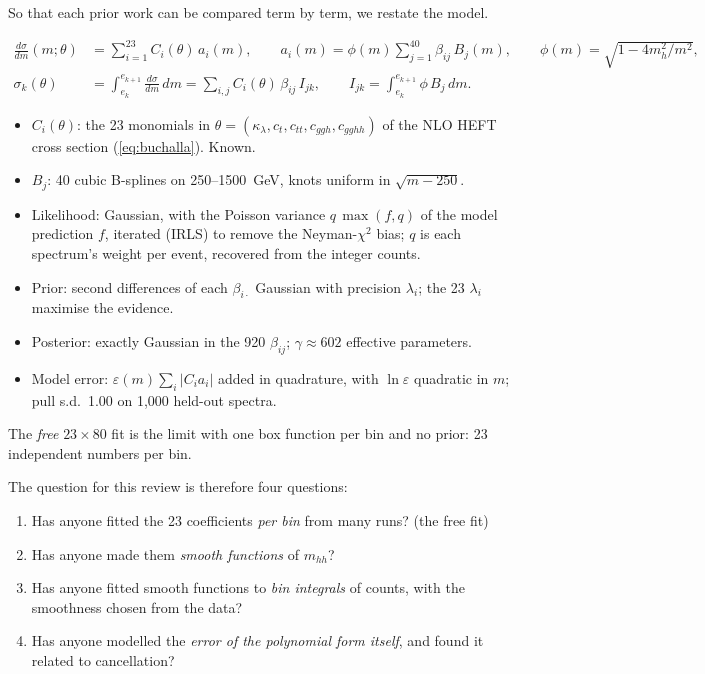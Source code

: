 So that each prior work can be compared term by term, we restate the model.

\begin{keyidea}
\begin{align}
\frac{d\sigma}{dm}(m;\theta) &= \sum_{i=1}^{23} C_i(\theta)\, a_i(m),
  \qquad a_i(m) = \phi(m)\sum_{j=1}^{40}\beta_{ij}\,B_j(m),
  \qquad \phi(m)=\sqrt{1-4m_h^2/m^2}, \label{eq:ours}\\
\sigma_k(\theta) &= \int_{e_k}^{e_{k+1}}\frac{d\sigma}{dm}\,dm
  = \sum_{i,j} C_i(\theta)\,\beta_{ij}\,I_{jk},
  \qquad I_{jk} = \int_{e_k}^{e_{k+1}}\phi\,B_j\,dm. \label{eq:bins}
\end{align}
\begin{itemize}[leftmargin=12pt]
  \item $C_i(\theta)$: the 23 monomials in $\theta=(\kappa_\lambda,c_t,c_{tt},c_{ggh},
    c_{gghh})$ of the NLO HEFT cross section (\cref{eq:buchalla}). Known.
  \item $B_j$: 40 cubic B-splines on 250--1500~GeV, knots uniform in $\sqrt{m-250}$.
  \item Likelihood: Gaussian, with the Poisson variance $q\,\max(f,q)$ of the model
    prediction $f$, iterated (IRLS) to remove the Neyman-$\chi^2$ bias; $q$ is each spectrum's
    weight per event, recovered from the integer counts.
  \item Prior: second differences of each $\beta_{i\cdot}$ Gaussian with precision
    $\lambda_i$; the 23 $\lambda_i$ maximise the evidence.
  \item Posterior: exactly Gaussian in the 920 $\beta_{ij}$; $\gamma\approx602$ effective
    parameters.
  \item Model error: $\varepsilon(m)\sum_i|C_ia_i|$ added in quadrature, with $\ln\varepsilon$
    quadratic in $m$; pull s.d.\ 1.00 on 1,000 held-out spectra.
\end{itemize}
The \emph{free} $23\times80$ fit is the limit with one box function per bin and no prior:
23 independent numbers per bin.
\end{keyidea}

\noindent
The question for this review is therefore four questions:
\begin{enumerate}[label=(Q\arabic*)]
  \item Has anyone fitted the 23 coefficients \emph{per bin} from many runs? (the free fit)
  \item Has anyone made them \emph{smooth functions} of $m_{hh}$?
  \item Has anyone fitted smooth functions to \emph{bin integrals} of counts, with the
    smoothness chosen from the data?
  \item Has anyone modelled the \emph{error of the polynomial form itself}, and found it
    related to cancellation?
\end{enumerate}

